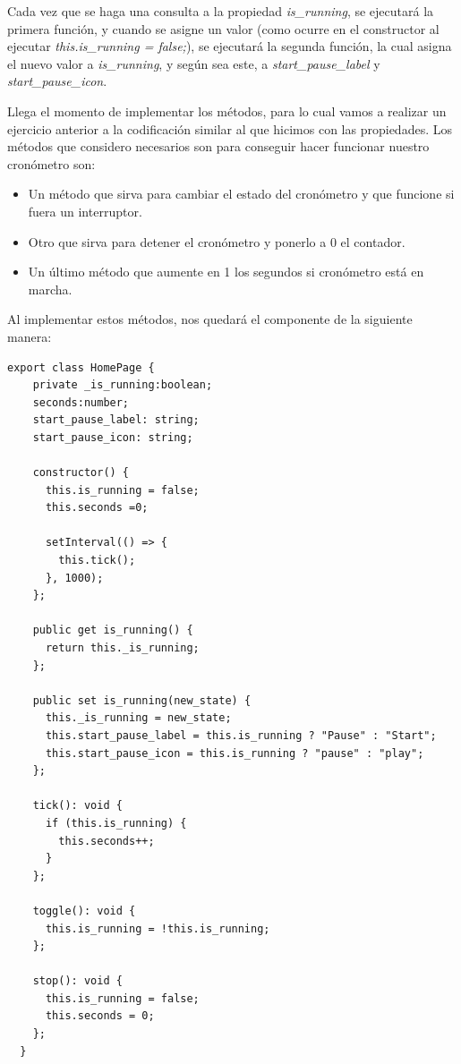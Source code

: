Cada vez que se haga una consulta a la propiedad \emph{is\_running}, se ejecutará la primera función, y cuando se asigne un valor (como ocurre en el constructor al ejecutar \emph{this.is\_running = false;}), se ejecutará la segunda función, la cual asigna el nuevo valor a \emph{is\_running}, y según sea este, a \emph{start\_pause\_label} y \emph{start\_pause\_icon}.

Llega el momento de implementar los métodos, para lo cual vamos a realizar un ejercicio anterior a la codificación similar al que hicimos con las propiedades. Los métodos que considero necesarios son para conseguir hacer funcionar nuestro cronómetro son:

\begin{itemize}
  \item Un método que sirva para cambiar el estado del cronómetro y que funcione si fuera un interruptor.
  \item Otro que sirva para detener el cronómetro y ponerlo a 0 el contador.
  \item Un último método que aumente en 1 los segundos si cronómetro está en marcha.
\end{itemize}

Al implementar estos métodos, nos quedará el componente de la siguiente manera:

\begin{lstlisting}[style=htmlcssjs,frame=tlrb,xleftmargin={0.2cm}]
  export class HomePage {
    private _is_running:boolean;
    seconds:number;
    start_pause_label: string;
    start_pause_icon: string;

    constructor() {
      this.is_running = false;
      this.seconds =0;

      setInterval(() => {
        this.tick();
      }, 1000);
    };

    public get is_running() {
      return this._is_running;
    };

    public set is_running(new_state) {
      this._is_running = new_state;
      this.start_pause_label = this.is_running ? "Pause" : "Start";
      this.start_pause_icon = this.is_running ? "pause" : "play";
    };

    tick(): void {
      if (this.is_running) {
        this.seconds++;
      }
    };

    toggle(): void {
      this.is_running = !this.is_running;
    };

    stop(): void {
      this.is_running = false;
      this.seconds = 0;
    };
  }
\end{lstlisting}

